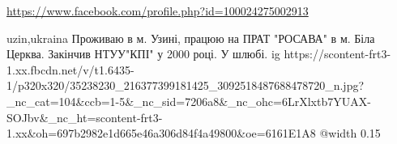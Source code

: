  
 
 
 
 

\url{https://www.facebook.com/profile.php?id=100024275002913}\par
uzin,ukraina
Проживаю в м. Узині, працюю на ПРАТ "РОСАВА" в м. Біла Церква. Закінчив НТУУ"КПІ" у 2000 році. У шлюбі.
\ifcmt
  ig https://scontent-frt3-1.xx.fbcdn.net/v/t1.6435-1/p320x320/35238230_216377399181425_3092518487688478720_n.jpg?_nc_cat=104&ccb=1-5&_nc_sid=7206a8&_nc_ohc=6LrXlxtb7YUAX-SOJbv&_nc_ht=scontent-frt3-1.xx&oh=697b2982e1d665e46a306d84f4a49800&oe=6161E1A8
  @width 0.15
\fi

